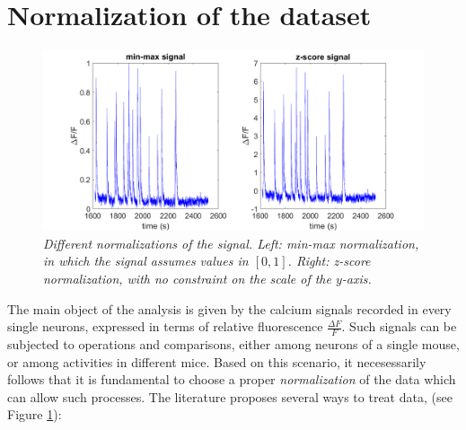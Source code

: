 \documentclass[12pt, a4paper]{report}
\begin{document}
\section{Normalization of the dataset} \label{norm}


\begin{figure}[H]
	
	\begin{center}
		\hspace*{-1cm}
		\includegraphics[scale=.47]{normalizations.png} 
	\end{center} 
	\caption{\textit{Different normalizations of the signal. Left: min-max normalization, in which the signal assumes values in $[0,1]$. Right: z-score normalization, with no constraint on the scale of the $y$-axis. }}
	\label{normalizations}
\end{figure}

The main object of the analysis is given by the calcium signals recorded in every single neurons, expressed in terms of relative fluorescence $\frac{\Delta F}{F}$. Such signals can be subjected to operations and comparisons, either among neurons of a single mouse, or among activities in different mice. Based on this scenario, it necesessarily follows that it is fundamental to choose a proper \textit{normalization} of the data which can allow such processes. The literature proposes several ways to treat data, (see Figure \ref{normalizations}):
\end{document}
